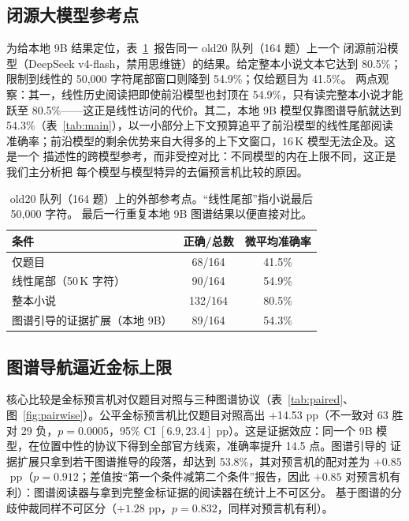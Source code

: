 \documentclass[UTF8,11pt]{ctexart}
\newcommand{\pp}{\ensuremath{\,\mathrm{pp}}}
\begin{document}
\subsection{闭源大模型参考点}
\label{sec:closedref}

为给本地 9B 结果定位，表~\ref{tab:closed}~报告同一 old20 队列（164 题）上一个
闭源前沿模型（DeepSeek v4-flash，禁用思维链）的结果。给定整本小说文本它达到
80.5\%；限制到线性的 50{,}000 字符尾部窗口则降到 54.9\%；仅给题目为 41.5\%。
两点观察：其一，线性历史阅读把即使前沿模型也封顶在 54.9\%，只有读完整本小说才能
跃至 80.5\%——这正是线性访问的代价。其二，本地 9B 模型仅靠图谱导航就达到
54.3\%（表~\ref{tab:main}），以一小部分上下文预算追平了前沿模型的线性尾部阅读
准确率；前沿模型的剩余优势来自大得多的上下文窗口，16\,K 模型无法企及。这是一个
描述性的跨模型参考，而非受控对比：不同模型的内在上限不同，这正是我们主分析把
每个模型与模型特异的去偏预言机比较的原因。

\begin{table}[t]
\centering
\caption{
old20 队列（164 题）上的外部参考点。``线性尾部''指小说最后 50{,}000 字符。
最后一行重复本地 9B 图谱结果以便直接对比。
}
\label{tab:closed}
\begin{tabular}{lcc}
\toprule
条件 & 正确/总数 & 微平均准确率 \\
\midrule
仅题目 & 68/164 & 41.5\% \\
线性尾部（50\,K 字符） & 90/164 & 54.9\% \\
整本小说 & 132/164 & 80.5\% \\
\midrule
图谱引导的证据扩展（本地 9B） & 89/164 & 54.3\% \\
\bottomrule
\end{tabular}
\end{table}

\subsection{图谱导航逼近金标上限}
\label{sec:goldceiling}

核心比较是金标预言机对仅题目对照与三种图谱协议（表~\ref{tab:paired}、
图~\ref{fig:pairwise}）。公平金标预言机比仅题目对照高出 +14.53\,\pp{}（不一致对
63 胜对 29 负，$p=0.0005$，95\% CI $[6.9, 23.4]$\,\pp）。这是证据效应：同一个
9B 模型，在位置中性的协议下得到全部官方线索，准确率提升 14.5 点。图谱引导的
证据扩展只拿到若干图谱推导的段落，却达到 53.8\%，其对预言机的配对差为
$+0.85$\,\pp{}（$p=0.912$；差值按``第一个条件减第二个条件''报告，因此 $+0.85$
对预言机有利）：图谱阅读器与拿到完整金标证据的阅读器在统计上不可区分。
基于图谱的分歧仲裁同样不可区分（$+1.28$\,\pp，$p=0.832$，同样对预言机有利）。
\end{document}
